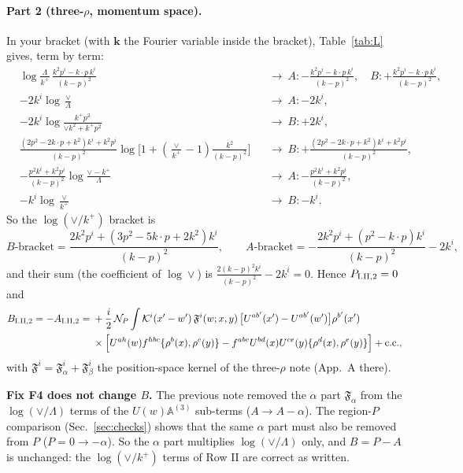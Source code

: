 \documentclass[10pt]{article}
\numberwithin{equation}{section}
\newcommand{\KK}{\mathcal K}
\newcommand{\NP}{\mathcal N_{P}}
\begin{document}
\paragraph{Part 2 (three-$\rho$, momentum space).} In your bracket (with $\mathbf k$ the Fourier variable inside the bracket), Table~\ref{tab:L} gives, term by term:
\begin{align*}
&\log\tfrac{\Lambda}{k^+}\,\tfrac{k^2p^i-k\cdot p\,k^i}{(k-p)^2}&&\to\ A:-\tfrac{k^2p^i-k\cdot p\,k^i}{(k-p)^2},\quad B:+\tfrac{k^2p^i-k\cdot p\,k^i}{(k-p)^2},\\
&-2k^i\log\tfrac{\vee}{\Lambda}&&\to\ A:-2k^i,\\
&-2k^i\log\tfrac{k^+p^2}{\vee k^2+k^+p^2}&&\to\ B:+2k^i,\\
&\tfrac{(2p^2-2k\cdot p+k^2)k^i+k^2p^i}{(k-p)^2}\log\big[1+(\tfrac{\vee}{k^+}-1)\tfrac{k^2}{(k-p)^2}\big]&&\to\ B:+\tfrac{(2p^2-2k\cdot p+k^2)k^i+k^2p^i}{(k-p)^2},\\
&-\tfrac{p^2k^i+k^2p^i}{(k-p)^2}\log\tfrac{\vee-k^+}{\Lambda}&&\to\ A:-\tfrac{p^2k^i+k^2p^i}{(k-p)^2},\\
&-k^i\log\tfrac{\vee}{k^+}&&\to\ B:-k^i.
\end{align*}
So the $\log(\vee/k^+)$ bracket is
\begin{equation}
B\text{-bracket}=\frac{2k^2p^i+(3p^2-5k\cdot p+2k^2)k^i}{(k-p)^2},\qquad A\text{-bracket}=-\frac{2k^2p^i+(p^2-k\cdot p)k^i}{(k-p)^2}-2k^i,
\end{equation}
and their sum (the coefficient of $\log\vee$) is $\frac{2(k-p)^2k^i}{(k-p)^2}-2k^i=0$. Hence $P_{\rm I.II,2}=0$ and
\begin{align}
B_{\rm I.II,2}=-A_{\rm I.II,2}={}&+\frac{i}{2}\,\NP\int\KK^i(x'-w')\,\mathfrak F^i(w;x,y)\,\big[U^{ab'}(x')-U^{ab'}(w')\big]\rho^{b'}(x')\notag\\
&\times\Big[U^{ah}(w)f^{hbc}\{\rho^b(x),\rho^c(y)\}-f^{abc}U^{bd}(x)U^{ce}(y)\{\rho^d(x),\rho^e(y)\}\Big]+{\rm c.c.},
\end{align}
with $\mathfrak F^i=\mathfrak F^i_\alpha+\mathfrak F^i_\beta$ the position-space kernel of the three-$\rho$ note (App.~A there).

\textbf{Fix F4 does not change $B$.} The previous note removed the $\alpha$ part $\mathfrak F_\alpha$ from the $\log(\vee/\Lambda)$ terms of the $U(w)\mathbb A^{(3)}$ sub-terms ($A\to A-\alpha$). The region-$P$ comparison (Sec.~\ref{sec:checks}) shows that the same $\alpha$ part must also be removed from $P$ ($P=0\to-\alpha$). So the $\alpha$ part multiplies $\log(\vee/\Lambda)$ only, and $B=P-A$ is unchanged: the $\log(\vee/k^+)$ terms of Row II are correct as written.
\end{document}
